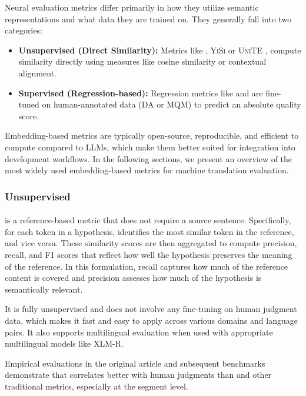 Neural evaluation metrics differ primarily in how they utilize semantic representations and what data they are trained on. They generally fall into two categories:
\begin{itemize}
    \item \textbf{Unsupervised (Direct Similarity):} Metrics like \bertscore, \textsc{YiSi} \citep{lo-2019-yisi} or \textsc{UniTE} \citep{wan-etal-2022-unite}, compute similarity directly using measures like cosine similarity or contextual alignment.
    \item \textbf{Supervised (Regression-based):} Regression metrics like \comet and \bleurt are fine-tuned on human-annotated data (DA or MQM) to predict an absolute quality score.
\end{itemize}
   
Embedding-based metrics are typically open-source, reproducible, and  efficient to compute compared to LLMs, which make them better suited for integration into development workflows. In the following sections, we present an overview of the most widely used embedding-based metrics for machine translation evaluation.

\subsubsection{Unsupervised} 
\noindent\paragraph{\bertscore} \citep{bertscore:2020} is a reference-based metric that does not require a source sentence. Specifically, for each token in a hypothesis, \bertscore identifies the most similar token in the reference, and vice versa. These similarity scores are then aggregated to compute precision, recall, and F1 scores that reflect how well the hypothesis preserves the meaning of the reference. In this formulation, recall captures how much of the reference content is covered and precision assesses how much of the hypothesis is semantically relevant.

It is fully unsupervised and does not involve any fine-tuning on human judgment data, which makes it fast and easy to apply across various domains and language pairs. It also supports multilingual evaluation when used with appropriate multilingual models like XLM-R.

Empirical evaluations in the original article and subsequent benchmarks~\citep{hanna-bojar-2021-fine, freitag-etal-2022-results} demonstrate that \bertscore correlates better with human judgments than \bleu and other traditional metrics, especially at the segment level. %

